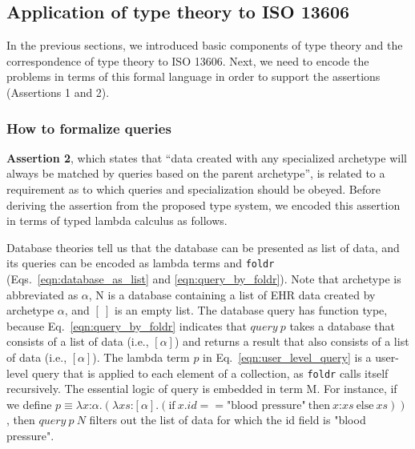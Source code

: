\documentclass[preprint,3p,onecolumn,times,review]{article}
\begin{document}
{\subsection{Application of type theory to ISO 13606}

In the previous sections, we introduced basic components of type theory and the correspondence of type theory to ISO 13606.
Next, we need to encode the problems in terms of this formal language in order to support the assertions (Assertions 1 and 2). 

\subsubsection{How to formalize queries \label{sec:howto_formalize_queries}}

{\bf Assertion 2}, which states that ``data created with any specialized archetype will always be matched by queries based on the parent archetype'', is related to a requirement as to which queries and specialization should be obeyed.
Before deriving the assertion from the proposed type system, we encoded this assertion in terms of typed lambda calculus as follows.

Database theories \cite{hillebrand96:_datab_query_languag_embed_typed_lambd_calcul,grust99:_compr_queries,grust99:_how_compr_queries_funct,poulovassilis96:_algeb} tell us that the database can be presented as list of data, and its queries can be encoded as lambda terms and {\tt foldr} (Eqs.~\ref{eqn:database_as_list} and \ref{eqn:query_by_foldr}).
Note that archetype is abbreviated as $\alpha$, N is a database containing a list of EHR data created by archetype $\alpha$, and $[~]$ is an empty list.
The database query has function type, because Eq.~\ref{eqn:query_by_foldr} indicates that $query~p$ takes a database that consists of a list of data (i.e., $[\alpha]$) and returns a result that also consists of a list of data (i.e., $[\alpha]$). The lambda term $p$ in Eq.~\ref{eqn:user_level_query} is a user-level query that is applied to each element of a collection, as {\tt{foldr}} calls itself recursively. The essential logic of query is embedded in term M. For instance, if we define $p \equiv \lambda x\text{:}\alpha.(\lambda xs\text{:}[\alpha].(\text{if}~ x.id == \text{"blood~pressure"} ~\text{then}~ x\text{:}xs ~\text{else}~ xs))$, then $query~p~N$ filters out the list of data for which the id field is "blood pressure".

}
\end{document}
